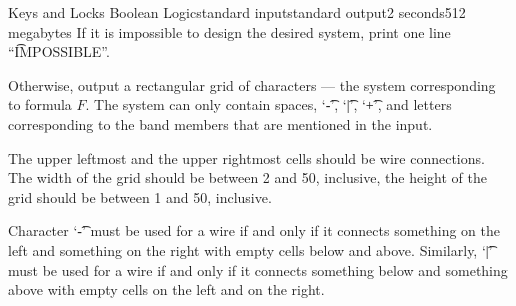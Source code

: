 \begin{problem}{Keys and Locks Boolean Logic}{standard input}{standard output}{2 seconds}{512 megabytes}
\OutputFile
If it is impossible to design the desired system, print one line ``\t{IMPOSSIBLE}''.

Otherwise, output a rectangular grid of characters --- the system corresponding to formula $F$. The system can only contain spaces, `\t{-}', `\t{|}', `\t{+}', and letters corresponding to the band members that are mentioned in the input.

The upper leftmost and the upper rightmost cells should be wire connections.
The width of the grid should be between 2 and 50, inclusive, the height of the grid should be between 1 and 50, inclusive.

Character `\t{-}' must be used for a wire if and only if it connects something on the left and something on the right with empty cells below and above. Similarly, `\t{|}' must be used for a wire if and only if it connects something below and something above with empty cells on the left and on the right.

\Examples

\begin{example}
%
%
%
%
%
\end{example}

\end{problem}

